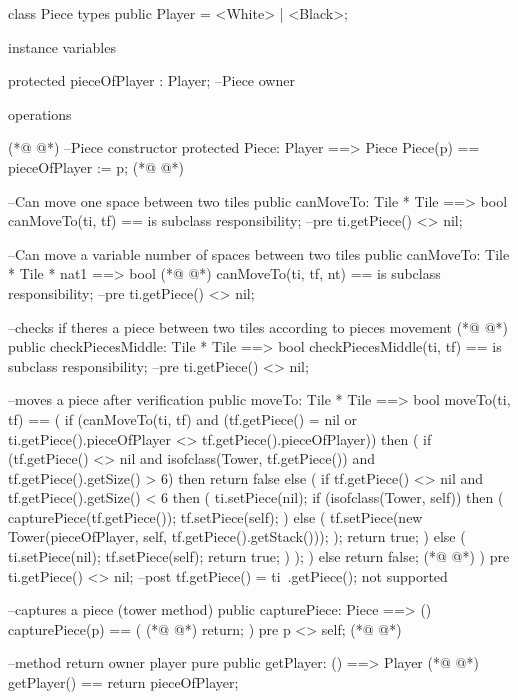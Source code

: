 \begin{vdmpp}[breaklines=true]
class Piece
types
  public Player = <White> | <Black>; 

instance variables

  protected pieceOfPlayer : Player; --Piece owner
  
operations

(*@
\label{Piece:11}
@*)
  --Piece constructor
  protected Piece: Player ==> Piece
  Piece(p) == pieceOfPlayer := p;
(*@
\label{canMoveTo:14}
@*)
  
  --Can move one space between two tiles
  public canMoveTo: Tile * Tile ==> bool
  canMoveTo(ti, tf) == is subclass responsibility;
  --pre ti.getPiece() <> nil;
  
  --Can move a variable number of spaces between two tiles
  public canMoveTo: Tile * Tile * nat1 ==> bool
(*@
\label{checkPiecesMiddle:22}
@*)
  canMoveTo(ti, tf, nt) == is subclass responsibility;
  --pre ti.getPiece() <> nil;
  
  --checks if theres a piece between two tiles according to pieces movement
(*@
\label{moveTo:26}
@*)
  public checkPiecesMiddle: Tile * Tile ==> bool
  checkPiecesMiddle(ti, tf) == is subclass responsibility;
  --pre ti.getPiece() <> nil;
  
  --moves a piece after verification 
  public moveTo: Tile * Tile ==> bool
  moveTo(ti, tf) == (
    if (canMoveTo(ti, tf) and (tf.getPiece() = nil or ti.getPiece().pieceOfPlayer <> tf.getPiece().pieceOfPlayer))
    then (
     if (tf.getPiece() <> nil and isofclass(Tower, tf.getPiece()) and tf.getPiece().getSize() > 6)
     then return false
     else (
      if tf.getPiece() <> nil and tf.getPiece().getSize() < 6
      then (
       ti.setPiece(nil);
       if (isofclass(Tower, self)) then (
        capturePiece(tf.getPiece());
        tf.setPiece(self);
       )
       else (
        tf.setPiece(new Tower(pieceOfPlayer, self, tf.getPiece().getStack()));
       );
       return true;
      )
      else (
       ti.setPiece(nil);
       tf.setPiece(self);
       return true;
      )
     );
    )
    else return false;
(*@
\label{capturePiece:58}
@*)
  )
  pre ti.getPiece() <> nil;
  --post tf.getPiece() = ti~.getPiece(); not supported 
  
  --captures a piece (tower method)
  public capturePiece: Piece ==> ()
  capturePiece(p) == (
(*@
\label{getPlayer:65}
@*)
   return;
  )
  pre p <> self;
(*@
\label{getStack:68}
@*)
  
  --method return owner player
  pure public getPlayer: () ==> Player
(*@
\label{getSize:71}
@*)
  getPlayer() == return pieceOfPlayer;
  

\end{vdmpp}
